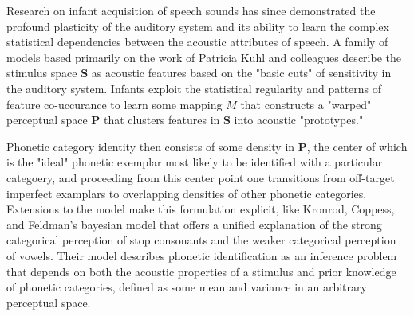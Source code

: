 \begin{multicols}{2}
Research on infant acquisition of speech sounds has since demonstrated the profound plasticity of the auditory system and its ability to learn the complex statistical dependencies between the acoustic attributes of speech\cite{kuhlNewViewLanguage2000}. A family of models based primarily on the work of Patricia Kuhl and colleagues describe the stimulus space $\mathbf{S}$ as acoustic features based on the "basic cuts" of sensitivity in the auditory system\cite{kuhlEarlyLanguageAcquisition2004}. Infants exploit the statistical regularity and patterns of feature co-uccurance to learn some mapping $M$ that constructs a "warped" perceptual space $\mathbf{P}$ that clusters features in $\mathbf{S}$ into acoustic "prototypes."\cite{kuhlNewViewLanguage2000} 

Phonetic category identity then consists of some density in $\mathbf{P}$, the center of which is the "ideal" phonetic exemplar most likely to be identified with a particular categoery, and proceeding from this center point one transitions from off-target imperfect examplars to overlapping densities of other phonetic categories. Extensions to the model make this formulation explicit, like Kronrod, Coppess, and Feldman's\cite{Kronrod2016a} bayesian model that offers a unified explanation of the strong categorical perception of stop consonants and the weaker categorical perception of vowels. Their model describes phonetic identification as an inference problem that depends on both the acoustic properties of a stimulus and prior knowledge of phonetic categories, defined as some mean and variance in an arbitrary perceptual space. 





\end{multicols}
